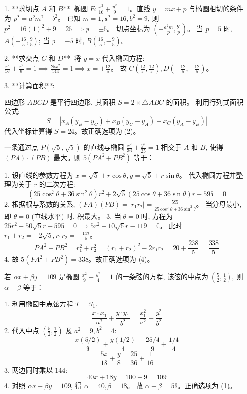 \begin{questions}
\begin{solution}
1. **求切点 $A$ 和 $B$**:
椭圆 $E: \frac{x^2}{16} + \frac{y^2}{9} = 1$。直线 $y = mx + p$ 与椭圆相切的条件为 $p^2 = a^2 m^2 + b^2$。
已知 $m = 1, a^2 = 16, b^2 = 9$, 则 $p^2 = 16(1)^2 + 9 = 25 \implies p = \pm 5$。
切点坐标为 $\left( -\frac{a^2 m}{p}, \frac{b^2}{p} \right)$。
当 $p = 5$ 时, $A\left( -\frac{16}{5}, \frac{9}{5} \right)$; 当 $p = -5$ 时, $B\left( \frac{16}{5}, -\frac{9}{5} \right)$。

2. **求交点 $C$ 和 $D$**:
将 $y = x$ 代入椭圆方程: $\frac{x^2}{16} + \frac{x^2}{9} = 1 \implies \frac{25x^2}{144} = 1 \implies x = \pm \frac{12}{5}$。
故 $C\left( \frac{12}{5}, \frac{12}{5} \right), D\left( -\frac{12}{5}, -\frac{12}{5} \right)$。

3. **计算面积**:

四边形 $ABCD$ 是平行四边形, 其面积 $S = 2 \times \triangle ABC$ 的面积。
利用行列式面积公式:
\[ S = \left| x_A(y_B - y_C) + x_B(y_C - y_A) + x_C(y_A - y_B) \right| \]
代入坐标计算得 $S = 24$。故正确选项为 (2)。
\end{solution}

\question
一条通过点 $P(\sqrt{5}, \sqrt{5})$ 的直线与椭圆 $\frac{x^2}{36} + \frac{y^2}{25} = 1$ 相交于 $A$ 和 $B$, 使得 $(PA) \cdot (PB)$ 最大。则 $5(PA^2 + PB^2)$ 等于：

\begin{solution}
1. 设直线的参数方程为 $x = \sqrt{5} + r\cos\theta, y = \sqrt{5} + r\sin\theta$。
代入椭圆方程并整理为关于 $r$ 的二次方程:
\[ (25\cos^2\theta + 36\sin^2\theta)r^2 + 2\sqrt{5}(25\cos\theta + 36\sin\theta)r - 595 = 0 \]
2. 根据根与系数的关系, $(PA)(PB) = |r_1 r_2| = \frac{595}{25\cos^2\theta + 36\sin^2\theta}$。
当分母最小, 即 $\theta = 0$ (直线水平) 时, 积最大。
3. 当 $\theta = 0$ 时, 方程为 $25r^2 + 50\sqrt{5}r - 595 = 0 \implies 5r^2 + 10\sqrt{5}r - 119 = 0$。
此时 $r_1 + r_2 = -2\sqrt{5}, r_1 r_2 = -\frac{119}{5}$。
\[ PA^2 + PB^2 = r_1^2 + r_2^2 = (r_1 + r_2)^2 - 2r_1 r_2 = 20 + \frac{238}{5} = \frac{338}{5} \]
4. 故 $5(PA^2 + PB^2) = 338$。故正确选项为 (4)。
\end{solution}

\question
若 $\alpha x + \beta y = 109$ 是椭圆 $\frac{x^2}{9} + \frac{y^2}{4} = 1$ 的一条弦的方程, 该弦的中点为 $\left( \frac{5}{2}, \frac{1}{2} \right)$, 则 $\alpha + \beta$ 等于：

\begin{solution}
1. 利用椭圆中点弦方程 $T = S_1$:
\[ \frac{x \cdot x_1}{a^2} + \frac{y \cdot y_1}{b^2} = \frac{x_1^2}{a^2} + \frac{y_1^2}{b^2} \]
2. 代入中点 $\left( \frac{5}{2}, \frac{1}{2} \right)$ 及 $a^2 = 9, b^2 = 4$:
\[ \frac{x(5/2)}{9} + \frac{y(1/2)}{4} = \frac{25/4}{9} + \frac{1/4}{4} \]
\[ \frac{5x}{18} + \frac{y}{8} = \frac{25}{36} + \frac{1}{16} \]
3. 两边同时乘以 $144$:
\[ 40x + 18y = 100 + 9 = 109 \]
4. 对照 $\alpha x + \beta y = 109$, 得 $\alpha = 40, \beta = 18$。
故 $\alpha + \beta = 58$。正确选项为 (1)。
\end{solution}


\end{questions}
